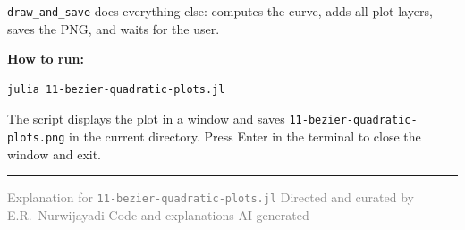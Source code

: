 \documentclass[12pt, a4paper]{article}
\newcommand{\cd}[1]{\texttt{#1}}
\begin{document}
\cd{draw\_and\_save} does everything else: computes the
curve, adds all plot layers, saves the PNG, and waits
for the user.

\begin{notebox}
\textbf{How to run:}
\begin{verbatim}
julia 11-bezier-quadratic-plots.jl
\end{verbatim}
The script displays the plot in a window and saves
\cd{11-bezier-quadratic-plots.png} in the current directory.
Press Enter in the terminal to close the window and exit.
\end{notebox}

\vspace{2em}\hrule\vspace{0.5em}
{\small\textcolor{gray}{%
Explanation for \texttt{11-bezier-quadratic-plots.jl}
\textbar{} Directed and curated by E.R.\ Nurwijayadi
\textbar{} Code and explanations AI-generated}}
\end{document}
